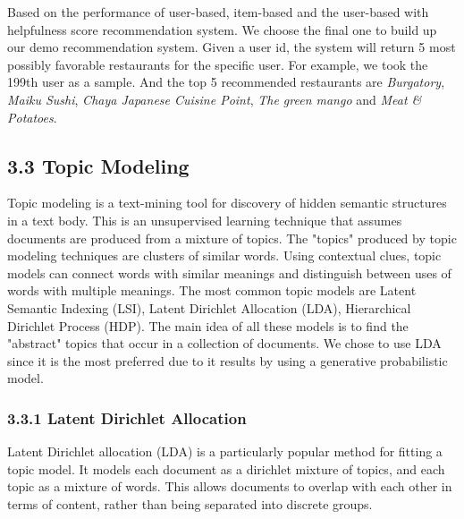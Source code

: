 \documentclass{neu_handout}
\begin{document}
Based on the performance of user-based, item-based and the user-based with helpfulness score recommendation system. We choose the final one to build up our demo recommendation system. Given a user id, the system will return 5 most possibly favorable restaurants for the specific user. For example, we took the 199th user as a sample. And the top 5 recommended restaurants are \emph{Burgatory}, \emph{Maiku Sushi}, \emph{Chaya Japanese Cuisine Point}, \emph{The green mango} and \emph{Meat \& Potatoes}. 
 
\subsection*{3.3 Topic Modeling}

Topic modeling is a text-mining tool for discovery of hidden semantic structures in a text body. This is an unsupervised learning technique that assumes documents are produced from a mixture of topics. The "topics" produced by topic modeling techniques are clusters of similar words. Using contextual clues, topic models can connect words with similar meanings and distinguish between uses of words with multiple meanings. 
The most common topic models are Latent Semantic Indexing (LSI), Latent Dirichlet Allocation (LDA), Hierarchical Dirichlet Process (HDP). The main idea of all these models is to find the "abstract" topics that occur in a collection of documents. We chose to use LDA since it is the most preferred due to it results by using a generative probabilistic model.

\subsubsection*{3.3.1 Latent Dirichlet Allocation}
Latent Dirichlet allocation (LDA) is a particularly popular method for fitting a topic model. It models each document as a dirichlet mixture of topics, and each topic as a mixture of words. This allows documents to overlap with each other in terms of content, rather than being separated into discrete groups.\\
\end{document}
